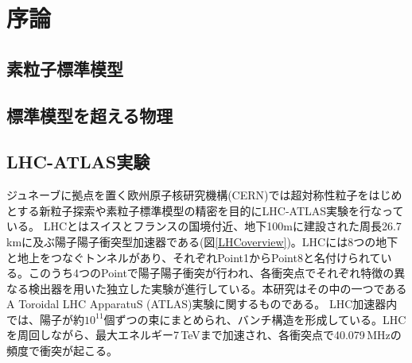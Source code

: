 \chapter{序論}
\label{chap_intro}




\section{素粒子標準模型}
\label{sec_intro_sm}

\section{標準模型を超える物理}
\label{sec_intro_bsm}

\section{LHC-ATLAS実験}
\label{sec_intro_atlas}

ジュネーブに拠点を置く欧州原子核研究機構(CERN)では超対称性粒子をはじめとする新粒子探索や素粒子標準模型の精密を目的にLHC-ATLAS実験を行なっている。
LHCとはスイスとフランスの国境付近、地下100mに建設された周長26.7 kmに及ぶ陽子陽子衝突型加速器である(図\ref{LHCoverview})。LHCには8つの地下と地上をつなぐトンネルがあり、それぞれPoint1からPoint8と名付けられている。このうち4つのPointで陽子陽子衝突が行われ、各衝突点でそれぞれ特徴の異なる検出器を用いた独立した実験が進行している。本研究はその中の一つであるA Toroidal LHC ApparatuS (ATLAS)実験に関するものである。
LHC加速器内では、陽子が約$10^{11}$個ずつの束にまとめられ、バンチ構造を形成している。LHCを周回しながら、最大エネルギー7\,TeVまで加速され、各衝突点で40.079\,MHzの頻度で衝突が起こる。

